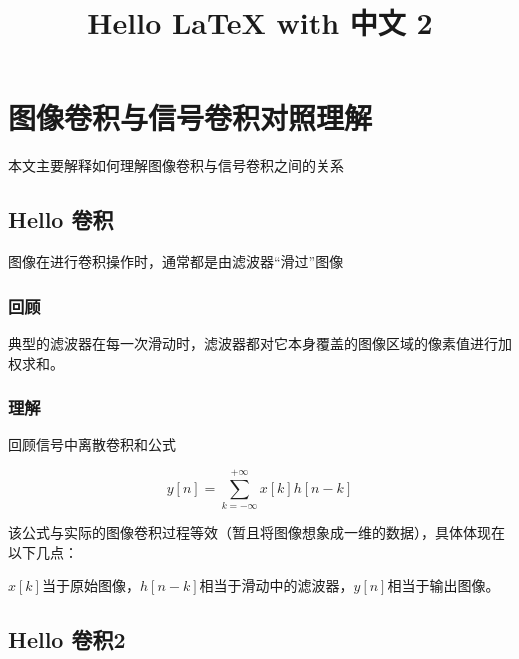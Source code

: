 \documentclass{article}
\title{Hello LaTeX with 中文 2}
\begin{document}
    \maketitle
    \section{图像卷积与信号卷积对照理解}
    本文主要解释如何理解图像卷积与信号卷积之间的关系
      \subsection{Hello 卷积}
      图像在进行{卷积}操作时，通常都是由滤波器“滑过”图像
      
      \subsubsection{回顾}
      典型的滤波器在每一次滑动时，滤波器都对它本身覆盖的图像区域的像素值进行加权求和。
    
      \subsubsection{理解}
      回顾信号中离散卷积和公式
    
      $$y\left[ n \right] = \sum\limits_{k =  - \infty }^{ + \infty } {x\left[ k \right]h\left[ {n - k} \right]}$$
    
      该公式与实际的图像卷积过程等效（暂且将图像想象成一维的数据），具体体现在以下几点：
    
      ${x\left[ k \right]}$当于原始图像，${h\left[ {n - k} \right]}$相当于滑动中的滤波器，$y\left[ n \right]$相当于输出图像。
    
    \subsection{Hello 卷积2}
  
    
\end{document}
